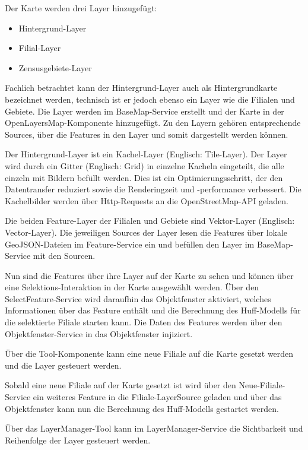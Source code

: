 Der Karte werden drei Layer hinzugefügt:

\begin{itemize}
\item Hintergrund-Layer
\item Filial-Layer
\item Zensusgebiete-Layer
\end{itemize}

Fachlich betrachtet kann der Hintergrund-Layer auch als Hintergrundkarte bezeichnet werden, technisch ist er jedoch ebenso ein Layer wie die Filialen und Gebiete. 
Die Layer werden im BaseMap-Service erstellt und der Karte in der OpenLayersMap-Komponente hinzugefügt.
Zu den Layern gehören entsprechende Sources, über die Features in den Layer und somit dargestellt werden können.

Der Hintergrund-Layer ist ein Kachel-Layer (Englisch: Tile-Layer).
Der Layer wird durch ein Gitter (Englisch: Grid) in einzelne Kacheln eingeteilt, die alle einzeln mit Bildern befüllt werden.
Dies ist ein Optimierungsschritt, der den Datentransfer reduziert sowie die Renderingzeit und -performance verbessert.
Die Kachelbilder werden über Http-Requests an die OpenStreetMap-API geladen.

Die beiden Feature-Layer der Filialen und Gebiete sind Vektor-Layer (Englisch: Vector-Layer).
Die jeweiligen Sources der Layer lesen die Features über lokale GeoJSON-Dateien im Feature-Service ein und befüllen den Layer im BaseMap-Service mit den Sourcen.

Nun sind die Features über ihre Layer auf der Karte zu sehen und können über eine Selektions-Interaktion in der Karte ausgewählt werden.
Über den SelectFeature-Service wird daraufhin das Objektfenster aktiviert, welches Informationen über das Feature enthält und die Berechnung des Huff-Modells für die selektierte Filiale starten kann.
Die Daten des Features werden über den Objektfenster-Service in das Objektfenster injiziert.

Über die Tool-Komponente kann eine neue Filiale auf die Karte gesetzt werden und die Layer gesteuert werden.

Sobald eine neue Filiale auf der Karte gesetzt ist wird über den Neue-Filiale-Service ein weiteres Feature in die Filiale-LayerSource geladen und über das Objektfenster kann nun die Berechnung des Huff-Modells gestartet werden.

Über das LayerManager-Tool kann im LayerManager-Service die Sichtbarkeit und Reihenfolge der Layer gesteuert werden.
